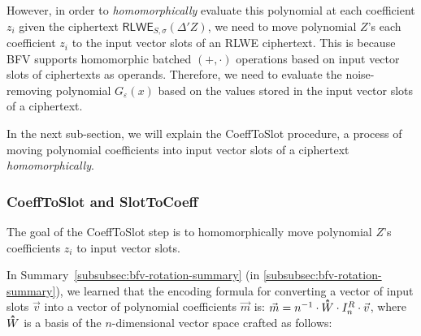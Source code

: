 




However, in order to \textit{homomorphically} evaluate this polynomial at each coefficient $z_i$ given the ciphertext $\textsf{RLWE}_{S, \sigma}(\Delta' Z)$, we need to move polynomial $Z$'s each coefficient $z_i$ to the input vector slots of an RLWE ciphertext. This is because BFV supports homomorphic batched $(+, \cdot)$ operations based on input vector slots of ciphertexts as operands. Therefore, we need to evaluate the noise-removing polynomial $G_\varepsilon(x)$ based on the values stored in the input vector slots of a ciphertext. 

In the next sub-section, we will explain the \textsf{CoeffToSlot} procedure, a process of moving polynomial coefficients into input vector slots of a ciphertext \textit{homomorphically}. 

\subsubsection{\textsf{CoeffToSlot} and \textsf{SlotToCoeff}}
\label{subsubsec:bfv-bootstrapping-coefftoslot}

The goal of the \textsf{CoeffToSlot} step is to homomorphically move polynomial $Z$'s coefficients $z_i$ to input vector slots. 


In Summary~\ref*{subsubsec:bfv-rotation-summary} (in \autoref{subsubsec:bfv-rotation-summary}), we learned that the encoding formula for converting a vector of input slots $\vec{v}$ into a vector of polynomial coefficients $\vec{m}$ is: $\vec{m} = n^{-1}\cdot\hathat W \cdot I_n^R \cdot \vec{v}$, where $\hathat W$ is a basis of the $n$-dimensional vector space crafted as follows: 

